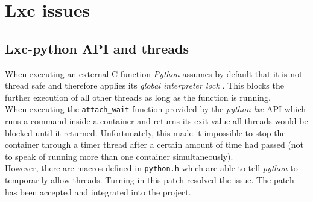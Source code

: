 \chapter{Lxc issues}

\section{Lxc-python API and threads}

When executing an external C function \textit{Python} assumes by default that it is not thread safe and
therefore applies its \textit{global interpreter lock} \cite{gil}. This blocks the further execution of all other
threads as long as the function is running.\\
When executing the \texttt{attach\_wait} function provided by the \textit{python-lxc} API which runs a command
inside a container and returns its exit value
all threads would be blocked until it returned. Unfortunately,
this made it impossible to stop the container through a timer thread after a certain amount of time had
passed (not to speak of running more than one container simultaneously).\\
However, there are macros defined in \texttt{python.h} which are able to tell \textit{python} to temporarily allow threads.
Turning in this patch\cite{bugreport} resolved the issue. The patch has been accepted and integrated into the project.
